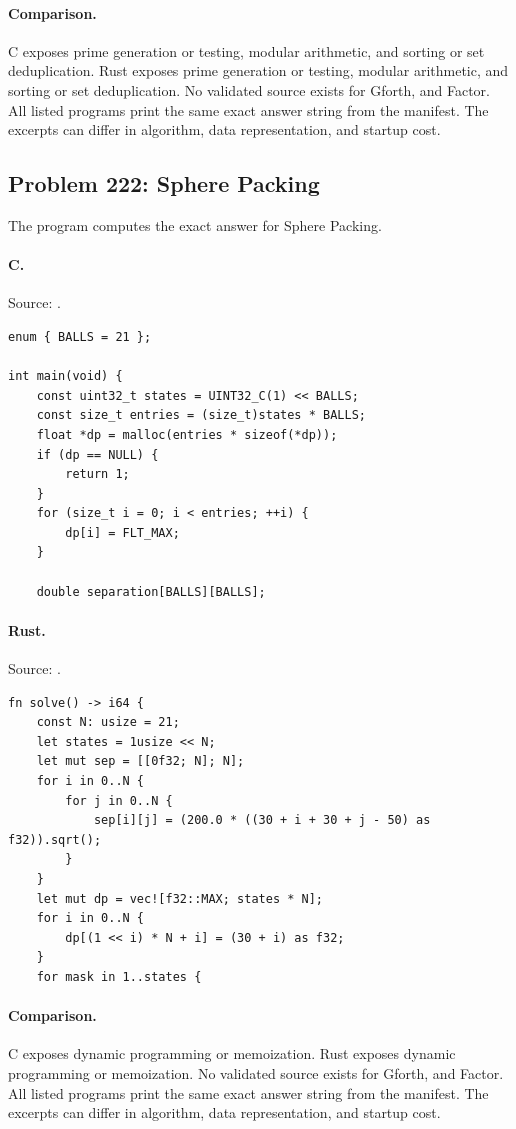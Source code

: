\paragraph{Comparison.}
C exposes prime generation or testing, modular arithmetic, and sorting or set deduplication. Rust exposes prime generation or testing, modular arithmetic, and sorting or set deduplication.
No validated source exists for Gforth, and Factor.
All listed programs print the same exact answer string from the manifest. The excerpts can differ in algorithm, data representation, and startup cost.

\subsection{Problem 222: Sphere Packing}
\label{walkthrough:p222}
The program computes the exact answer for Sphere Packing.

\paragraph{C.} Source: .
\begin{lstlisting}
enum { BALLS = 21 };

int main(void) {
    const uint32_t states = UINT32_C(1) << BALLS;
    const size_t entries = (size_t)states * BALLS;
    float *dp = malloc(entries * sizeof(*dp));
    if (dp == NULL) {
        return 1;
    }
    for (size_t i = 0; i < entries; ++i) {
        dp[i] = FLT_MAX;
    }

    double separation[BALLS][BALLS];
\end{lstlisting}

\paragraph{Rust.} Source: .
\begin{lstlisting}
fn solve() -> i64 {
    const N: usize = 21;
    let states = 1usize << N;
    let mut sep = [[0f32; N]; N];
    for i in 0..N {
        for j in 0..N {
            sep[i][j] = (200.0 * ((30 + i + 30 + j - 50) as f32)).sqrt();
        }
    }
    let mut dp = vec![f32::MAX; states * N];
    for i in 0..N {
        dp[(1 << i) * N + i] = (30 + i) as f32;
    }
    for mask in 1..states {
\end{lstlisting}

\paragraph{Comparison.}
C exposes dynamic programming or memoization. Rust exposes dynamic programming or memoization.
No validated source exists for Gforth, and Factor.
All listed programs print the same exact answer string from the manifest. The excerpts can differ in algorithm, data representation, and startup cost.

